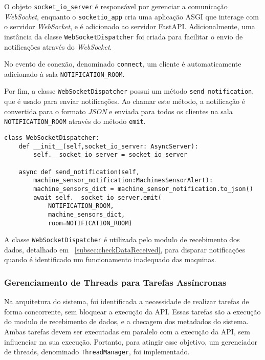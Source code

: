 O objeto \texttt{socket\_io\_server} é responsável por gerenciar a comunicação \textit{WebSocket}, enquanto o \texttt{socketio\_app} cria uma aplicação \gls{ASGI} que interage com o servidor \textit{WebSocket}, e é adicionado ao servidor FastAPI. Adicionalmente, uma instância da classe \texttt{WebSocketDispatcher} foi criada para facilitar o envio de notificações através do \textit{WebSocket}.

No evento de conexão, denominado \texttt{connect}, um cliente é automaticamente adicionado à sala \texttt{NOTIFICATION\_ROOM}.

Por fim, a classe \texttt{WebSocketDispatcher} possui um método \texttt{send\_notification}, que é usado para enviar notificações. Ao chamar este método, a notificação é convertida para o formato \textit{JSON} e enviada para todos os clientes na sala \texttt{NOTIFICATION\_ROOM} através do método \texttt{emit}.

\begin{verbatim}
class WebSocketDispatcher:
    def __init__(self,socket_io_server: AsyncServer):
        self.__socket_io_server = socket_io_server
    
    async def send_notification(self,
        machine_sensor_notification:MachinesSensorAlert):
        machine_sensors_dict = machine_sensor_notification.to_json()
        await self.__socket_io_server.emit(
            NOTIFICATION_ROOM,
            machine_sensors_dict,
            room=NOTIFICATION_ROOM)
\end{verbatim}

A classe \texttt{WebSocketDispatcher} é utilizada pelo modulo de recebimento dos dados, detalhado em ~\ref{subsec:checkDataReceived}, para disparar notificações quando é identificado um funcionamento inadequado das maquinas.


\subsubsection{Gerenciamento de Threads para Tarefas Assíncronas}\label{subsubsec:ThreadManager}

Na arquitetura do sistema, foi identificada a necessidade de realizar tarefas de forma concorrente, sem bloquear a execução da \gls{API}. Essas tarefas são a execução do modulo de recebimento de dados, e a checagem dos metadados do sistema. Ambas tarefas devem ser executadas em paralelo com a execução da \gls{API}, sem influenciar na sua execução. Portanto, para atingir esse objetivo, um gerenciador de threads, denominado \texttt{ThreadManager}, foi implementado.

